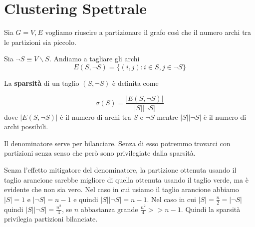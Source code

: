 \documentclass[12pt]{report}
\begin{document}
\section{Clustering Spettrale}

Sia $G = V,E$ vogliamo riuscire a partizionare il grafo così che il numero archi tra le partizioni sia piccolo.


\noindent 
Sia $\neg S \equiv V \backslash S$. Andiamo a tagliare gli archi 
$$E(S,\neg S) = \{(i,j) : i \in S, j \in \neg S\}$$


\begin{defi}
    La \textbf{sparsità} di un taglio $(S,\neg S)$ è  definita come

    $$\sigma(S) = \frac{|E(S,\neg S)|}{|S||\neg S|}$$
    dove $|E(S,\neg S)|$ è il numero di archi tra $S$ e $\neg S$ mentre $|S||\neg S|$ è il numero di archi possibili.
\end{defi}
Il denominatore serve per bilanciare. Senza di esso potremmo trovarci con partizioni senza senso che però sono privilegiate dalla sparsità.


 \noindent 
 Senza l'effetto mitigatore del denominatore, la partizione ottenuta usando il taglio arancione sarebbe migliore di quella ottenuta usando il taglio verde, ma è evidente che non sia vero. Nel caso in cui usiamo il taglio arancione abbiamo $|S| = 1$ e $|\neg S| = n - 1$ e quindi $|S| |\neg S | = n-1$. Nel caso in cui $|S| = \frac{n}{2} = |\neg S|$ quindi $|S| |\neg S| = \frac{n^2}{4}$, se $n$ abbastanza grande $\frac{n^2}{4} >> n-1$. Quindi la sparsità privilegia partizioni bilanciate. 
\end{document}
